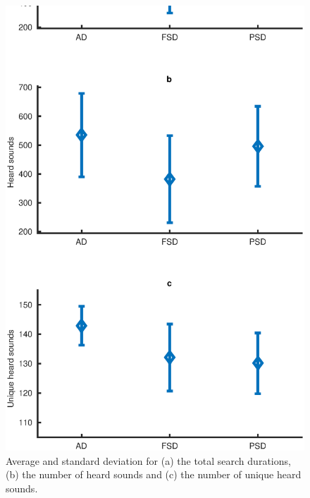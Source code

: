 \documentclass{aes2e}
\begin{document}
\begin{figure}[t]
\begin{center}
\includegraphics[scale=0.4]{gfx/analyse_urban1.eps} 
\end{center}
\caption{\label{fig1urban} Average and standard deviation for (a) the total search durations, (b) the number of heard sounds and (c) the number of unique heard sounds.}
\end{figure}  
\end{document}
